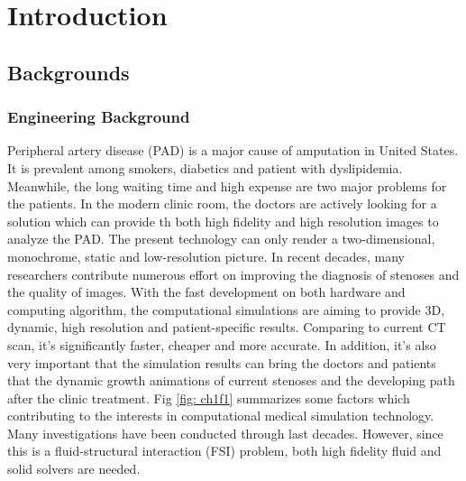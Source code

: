 \chapter{Introduction}
\label{ch:chap1}


\section{Backgrounds}

\subsection{Engineering Background}

Peripheral artery disease (PAD) is a major cause of amputation in United States. It is prevalent among smokers, diabetics and patient with dyslipidemia. Meanwhile, the long waiting time and high expense are two major problems for the patients. In the modern clinic room, the doctors are actively looking for a solution which can provide th both high fidelity and high resolution images to analyze the PAD. The  present technology can only render a two-dimensional,  monochrome, static and low-resolution picture. In recent decades, many researchers contribute numerous effort on improving the diagnosis of stenoses and the quality of images\cite{clark1976fluid, nesbitt2009shear, wardlaw2006non, stergiopulos1992computer, long2001numerical}. With the fast development on both hardware and computing algorithm, the computational simulations are aiming to provide 3D, dynamic, high resolution and patient-specific results. Comparing to current CT scan, it's significantly faster, cheaper and more accurate. In addition, it's also very important that the simulation results can bring the doctors and patients that the dynamic growth animations of current stenoses and the developing path after the clinic treatment. Fig \ref{fig: ch1f1} summarizes some factors which contributing to the interests in computational medical simulation technology\cite{barry2005features}. Many investigations have been conducted through last decades\cite{feng2012viscous, bertram2010evaluation, nadeem2010simulation, ogulu2005simulation}. However, since this is a fluid-structural interaction (FSI) problem, both high fidelity fluid and solid solvers are needed. 

